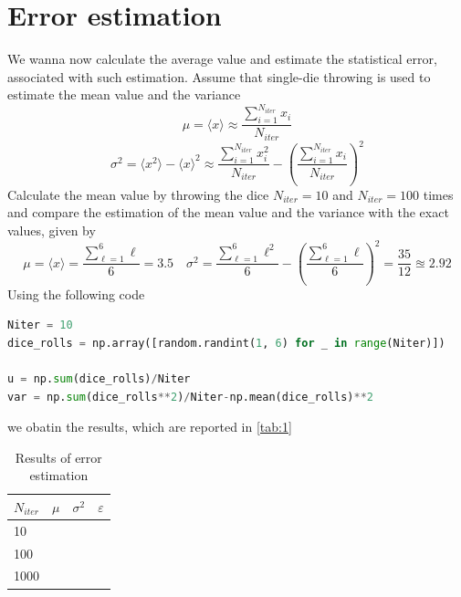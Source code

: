 \documentclass{article}
\begin{document}
\section{Error estimation}
We wanna now calculate the average value and estimate the statistical error, associated with such estimation. Assume that single-die throwing is used to estimate the mean value and the variance
\begin{equation}
    \mu=\langle x\rangle\approx\frac{\sum_{i=1}^{N_{iter}}{x_i}}{N_{iter}}
\end{equation}
\begin{equation}
    \sigma^2=\langle x^2\rangle-\langle x \rangle^2\approx\frac{\sum_{i=1}^{N_{iter}}{x_i^2}}{N_{iter}}-\left(\frac{\sum_{i=1}^{N_{iter}}{x_i}}{N_{iter}}\right)^2
\end{equation}
Calculate the mean value by throwing the dice $N_{iter}=10$ and $N_{iter}=100$ times and compare the estimation of the mean value and the variance with the exact values, given by
\begin{equation*}
    \mu=\langle x\rangle=\frac{\sum_{\ell=1}^{6}{\ell}}{6}=3.5\quad \sigma^2=\frac{\sum_{\ell=1}^{6}{\ell^2}}{6}-\left(\frac{\sum_{\ell=1}^{6}{\ell}}{6}\right)^2=\frac{35}{12}\approxeq2.92
\end{equation*}
Using the following code
\begin{lstlisting}[language=Python]
Niter = 10
dice_rolls = np.array([random.randint(1, 6) for _ in range(Niter)])

u = np.sum(dice_rolls)/Niter
var = np.sum(dice_rolls**2)/Niter-np.mean(dice_rolls)**2
\end{lstlisting}
we obatin the results, which are reported in \autoref{tab:1}
\begin{table}[H]
    \centering
    \begin{tabular}{|l|c|c|c|}
        \hline $N_{iter}$  & $\mu$ & $\sigma^2$ &  $\varepsilon $\\\hline\hline
        10 &  &  & \\\hline
        100 &  &  & \\\hline
        1000 &  &  & \\\hline
    \end{tabular}
    \caption{Results of error estimation}
    \label{tab:1}
\end{table}
\end{document}
